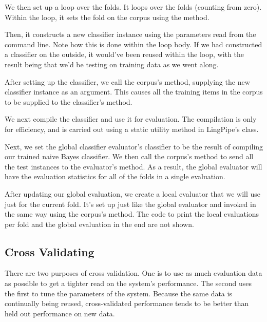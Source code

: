 We then set up a loop over the folds.
%
%
It loops over the folds (counting from zero).  Within the loop, it
sets the fold on the corpus using the  method.

Then, it constructs a new classifier instance using the parameters
read from the command line.  Note how this is done within the loop
body.  If we had constructed a classifier on the outside, it would've
been reused within the loop, with the result being that we'd be
testing on training data as we went along.

After setting up the classifier, we call the corpus's
 method, supplying the new classifier instance as
an argument.  This causes all the training items in the corpus to be
supplied to the classifier's 
method.

We next compile the classifier and use it for evaluation.
%
%
The compilation is only for efficiency, and is carried out using a
static utility method in LingPipe's 
class.

Next, we set the global classifier evaluator's classifier to be the
result of compiling our trained naive Bayes classifier.  We then call
the corpus's  method to send all the test instances
to the evaluator's  method.
As a result, the global evaluator will have the evaluation statistics
for all of the folds in a single evaluation.  

After updating our global evaluation, we create a local evaluator
that we will use just for the current fold.  It's set up just like
the global evaluator and invoked in the same way using the corpus's
 method.  The code to print the local evaluations
per fold and the global evaluation in the end are not shown.

\subsection{Cross Validating}

There are two purposes of cross validation.  One is to use as much
evaluation data as possible to get a tighter read on the system's
performance.  The second uses the first to tune the parameters of the
system.  Because the same data is continually being reused,
cross-validated performance tends to be better than held out
performance on new data.

